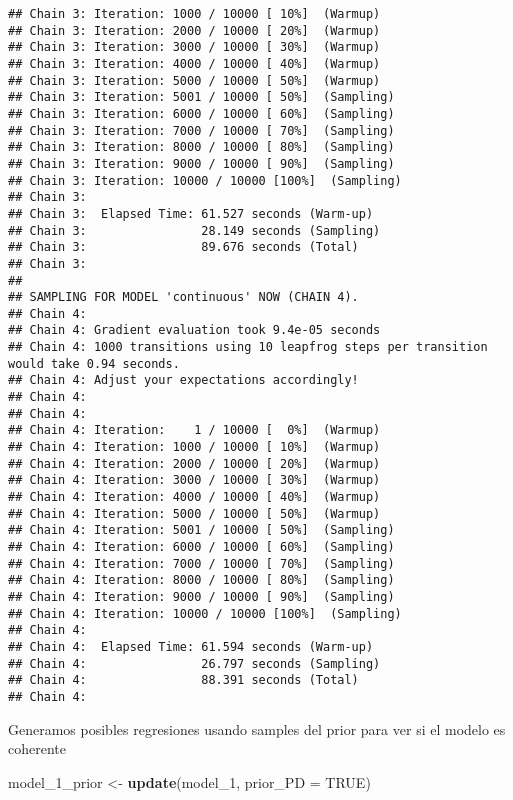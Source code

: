 \documentclass[
]{article}
\newenvironment{Shaded}{\begin{snugshade}}{\end{snugshade}}
\newcommand{\AttributeTok}[1]{\textcolor[rgb]{0.13,0.29,0.53}{#1}}
\newcommand{\ConstantTok}[1]{\textcolor[rgb]{0.56,0.35,0.01}{#1}}
\newcommand{\FunctionTok}[1]{\textcolor[rgb]{0.13,0.29,0.53}{\textbf{#1}}}
\newcommand{\NormalTok}[1]{#1}
\newcommand{\OtherTok}[1]{\textcolor[rgb]{0.56,0.35,0.01}{#1}}
\begin{document}
\begin{verbatim}
## Chain 3: Iteration: 1000 / 10000 [ 10%]  (Warmup)
## Chain 3: Iteration: 2000 / 10000 [ 20%]  (Warmup)
## Chain 3: Iteration: 3000 / 10000 [ 30%]  (Warmup)
## Chain 3: Iteration: 4000 / 10000 [ 40%]  (Warmup)
## Chain 3: Iteration: 5000 / 10000 [ 50%]  (Warmup)
## Chain 3: Iteration: 5001 / 10000 [ 50%]  (Sampling)
## Chain 3: Iteration: 6000 / 10000 [ 60%]  (Sampling)
## Chain 3: Iteration: 7000 / 10000 [ 70%]  (Sampling)
## Chain 3: Iteration: 8000 / 10000 [ 80%]  (Sampling)
## Chain 3: Iteration: 9000 / 10000 [ 90%]  (Sampling)
## Chain 3: Iteration: 10000 / 10000 [100%]  (Sampling)
## Chain 3: 
## Chain 3:  Elapsed Time: 61.527 seconds (Warm-up)
## Chain 3:                28.149 seconds (Sampling)
## Chain 3:                89.676 seconds (Total)
## Chain 3: 
## 
## SAMPLING FOR MODEL 'continuous' NOW (CHAIN 4).
## Chain 4: 
## Chain 4: Gradient evaluation took 9.4e-05 seconds
## Chain 4: 1000 transitions using 10 leapfrog steps per transition would take 0.94 seconds.
## Chain 4: Adjust your expectations accordingly!
## Chain 4: 
## Chain 4: 
## Chain 4: Iteration:    1 / 10000 [  0%]  (Warmup)
## Chain 4: Iteration: 1000 / 10000 [ 10%]  (Warmup)
## Chain 4: Iteration: 2000 / 10000 [ 20%]  (Warmup)
## Chain 4: Iteration: 3000 / 10000 [ 30%]  (Warmup)
## Chain 4: Iteration: 4000 / 10000 [ 40%]  (Warmup)
## Chain 4: Iteration: 5000 / 10000 [ 50%]  (Warmup)
## Chain 4: Iteration: 5001 / 10000 [ 50%]  (Sampling)
## Chain 4: Iteration: 6000 / 10000 [ 60%]  (Sampling)
## Chain 4: Iteration: 7000 / 10000 [ 70%]  (Sampling)
## Chain 4: Iteration: 8000 / 10000 [ 80%]  (Sampling)
## Chain 4: Iteration: 9000 / 10000 [ 90%]  (Sampling)
## Chain 4: Iteration: 10000 / 10000 [100%]  (Sampling)
## Chain 4: 
## Chain 4:  Elapsed Time: 61.594 seconds (Warm-up)
## Chain 4:                26.797 seconds (Sampling)
## Chain 4:                88.391 seconds (Total)
## Chain 4:
\end{verbatim}

Generamos posibles regresiones usando samples del prior para ver si el
modelo es coherente

\begin{Shaded}
\begin{Highlighting}[]
\NormalTok{model\_1\_prior }\OtherTok{\textless{}{-}} \FunctionTok{update}\NormalTok{(model\_1, }\AttributeTok{prior\_PD =} \ConstantTok{TRUE}\NormalTok{)}
\end{Highlighting}
\end{Shaded}
\end{document}
